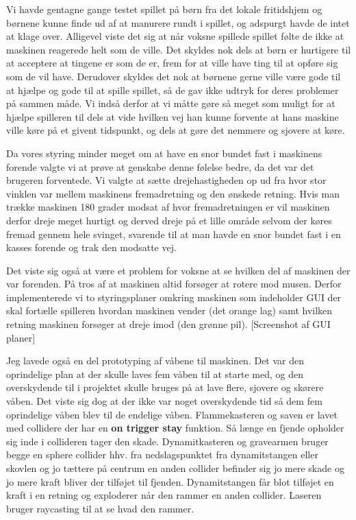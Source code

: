 Vi havde gentagne gange testet spillet på børn fra det lokale fritidshjem og børnene kunne finde ud af at manurere rundt i spillet, og adspurgt havde de intet at klage over. Alligevel viste det sig at når voksne spillede spillet følte de ikke at maskinen reagerede helt som de ville. Det skyldes nok dels at børn er hurtigere til at acceptere at tingene er som de er, frem for at ville have ting til at opføre sig som de vil have. Derudover skyldes det nok at børnene gerne ville være gode til at hjælpe og gode til at spille spillet, så de gav ikke udtryk for deres problemer på sammen måde. Vi indså derfor at vi måtte gøre så meget som muligt for at hjælpe spilleren til dels at vide hvilken vej han kunne forvente at hans maskine ville køre på et givent tidspunkt, og dels at gøre det nemmere og sjovere at køre.

Da vores styring minder meget om at have en snor bundet fast i maskinens forende valgte vi at prøve at genskabe denne følelse bedre, da det var det brugeren forventede. Vi valgte at sætte drejehastigheden op ud fra hvor stor vinklen var mellem maskinens fremadretning og den ønskede retning. Hvis man trække maskinen 180 grader modsat af hvor fremadretningen er vil maskinen derfor dreje meget hurtigt og derved dreje på et lille område selvom der køres fremad gennem hele svinget, svarende til at man havde en snor bundet fast i en kasses forende og trak den modsatte vej. 

Det viste sig også at være et problem for voksne at se hvilken del af maskinen der var forenden. På tros af at maskinen altid forsøger at rotere mod musen. Derfor implementerede vi to styringsplaner omkring maskinen som indeholder GUI der skal fortælle spilleren hvordan maskinen vender (det orange lag) samt hvilken retning maskinen forsøger at dreje imod (den grønne pil).
[Screenshot af GUI planer]

Jeg lavede også en del prototyping af våbene til maskinen. Det var den oprindelige plan at der skulle laves fem våben til at starte med, og den overskydende til i projektet skulle bruges på at lave flere, sjovere og skørere våben. Det viste sig dog at der ikke var noget overskydende tid så dem fem oprindelige våben blev til de endelige våben. Flammekasteren og saven er lavet med collidere der har en \textbf{on trigger stay} funktion. Så længe en fjende opholder sig inde i collideren tager den skade. Dynamitkasteren og gravearmen bruger begge en sphere collider hhv. fra nedslagspunktet fra dynamitstangen eller skovlen og jo tættere på centrum en anden collider befinder sig jo mere skade og jo mere kraft bliver der tilføjet til fjenden. Dynamitstangen får blot tilføjet en kraft i en retning og exploderer når den rammer en anden collider. Laseren bruger raycasting til at se hvad den rammer.

